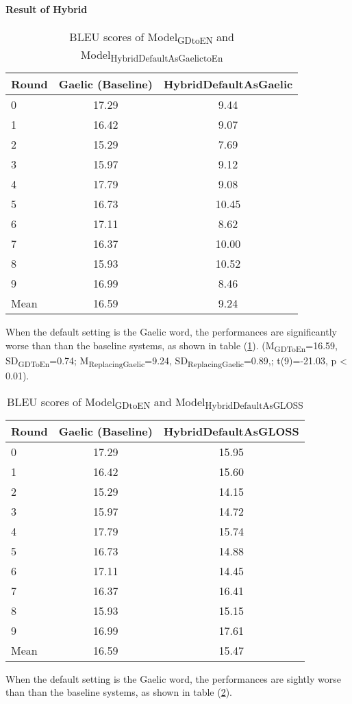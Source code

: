 \documentclass[a4paper]{article}
\begin{document}
\paragraph{Result of Hybrid}    
\begin{table}[ht]
\centering
\begin{tabular}{lcc}
  \hline
Round & Gaelic (Baseline) & HybridDefaultAsGaelic \\ 
  \hline
0 & 17.29 & 9.44 \\ 
  1 & 16.42 & 9.07 \\ 
  2 & 15.29 & 7.69 \\ 
  3 & 15.97 & 9.12 \\ 
  4 & 17.79 & 9.08 \\ 
  5 & 16.73 & 10.45 \\ 
  6 & 17.11 & 8.62 \\ 
  7 & 16.37 & 10.00 \\ 
  8 & 15.93 & 10.52 \\ 
  9 & 16.99 & 8.46 \\ 
   \hline
Mean & 16.59 & 9.24 \\ 
   \hline
\end{tabular}
\caption{BLEU scores of Model\textsubscript{GDtoEN} and Model\textsubscript{HybridDefaultAsGaelictoEn}} 
\label{Table:HybridDefaultAsGaelic}
\end{table}When the default setting is the Gaelic word, the performances are significantly worse than than the baseline systems, as shown in table (\ref{Table:HybridDefaultAsGaelic}).  
(M\textsubscript{GDToEn}=16.59, SD\textsubscript{GDToEn}=0.74; M\textsubscript{ReplacingGaelic}=9.24, SD\textsubscript{ReplacingGaelic}=0.89,; t(9)=-21.03, p < 0.01).
\begin{table}[ht]
\centering
\begin{tabular}{lcc}
  \hline
Round & Gaelic (Baseline) & HybridDefaultAsGLOSS \\ 
  \hline
0 & 17.29 & 15.95 \\ 
  1 & 16.42 & 15.60 \\ 
  2 & 15.29 & 14.15 \\ 
  3 & 15.97 & 14.72 \\ 
  4 & 17.79 & 15.74 \\ 
  5 & 16.73 & 14.88 \\ 
  6 & 17.11 & 14.45 \\ 
  7 & 16.37 & 16.41 \\ 
  8 & 15.93 & 15.15 \\ 
  9 & 16.99 & 17.61 \\ 
   \hline
Mean & 16.59 & 15.47 \\ 
   \hline
\end{tabular}
\caption{BLEU scores of Model\textsubscript{GDtoEN} and Model\textsubscript{HybridDefaultAsGLOSS}} 
\label{Table:HybridDefaultAsGLOSS}
\end{table}When the default setting is the Gaelic word, the performances are sightly worse than than the baseline systems, as shown in table (\ref{Table:HybridDefaultAsGLOSS}).
\end{document}
